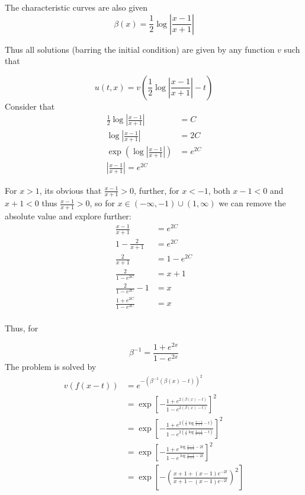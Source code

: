 \documentclass{article} %
\begin{document}
The characteristic curves are also given
\[
  \beta(x) = \frac{1}{2}\log\left|\frac{x-1}{x+1}\right|
\]

Thus all solutions (barring the initial condition) are given by any
function $v$ such that

\[
  u(t,x)  = v\left(\frac{1}{2}\log\left|\frac{x-1}{x+1}\right| - t \right)
\]
Consider that
\begin{align*}
  \frac{1}{2}\log\left|\frac{x-1}{x+1}\right| &= C \\
  \log\left|\frac{x-1}{x+1}\right| &= 2C \\
  \exp\left(\log\left|\frac{x-1}{x+1}\right|\right) &= e^{2C} \\
  \left|\frac{x-1}{x+1}\right| = e^{2C}
\end{align*}

For $x > 1$, its obvious that $\frac{x-1}{x+1} > 0$, further, for $x
< -1$, both $x - 1 < 0$ and $x + 1 < 0$ thus $\frac{x-1}{x+1} > 0$, so for
$x \in (-\infty, -1) \cup (1, \infty)$ we can remove the absolute
value and explore further:
\begin{align*}
  \frac{x-1}{x+1} &= e^{2C} \\
  1 - \frac{2}{x+1} &= e^{2C} \\
  \frac{2}{x+1} &= 1 - e^{2C} \\
  \frac{2}{1-e^{2C}} &= x + 1 \\
  \frac{2}{1-e^{2C}} - 1 &= x \\
  \frac{1+e^{2C}}{1-e^{2C}} &= x \\
\end{align*}

Thus, for

\[
  \beta^{-1} = \frac{1+e^{2x}}{1-e^{2x}}
\]
The problem is solved by
\begin{align*}
  v(f(x - t)) &= e^{-(\beta^{-1}(\beta(x) - t))^2} \\
  &= \exp\left[-\frac{1+e^{2(\beta(x) - t)}}{1-e^{2(\beta(x) -t)}}\right]^2 \\
  &= \exp\left[-\frac{1+e^{2(\frac{1}{2}\log\frac{x-1}{x+1} -
  t)}}{1-e^{2(\frac{1}{2}\log\frac{x-1}{x+1} -t)}}\right]^2 \\
  &= \exp\left[-\frac{1+e^{\log\frac{x-1}{x+1} -
  2t}}{1-e^{\log\frac{x-1}{x+1} -2t}}\right]^2 \\
  &= \exp\left[-\left(\frac{x+1 +(x-1)e^{-2t}}{x+1 -
  (x-1)e^{-2t}}\right)^2 \right]
\end{align*}
\end{document}
